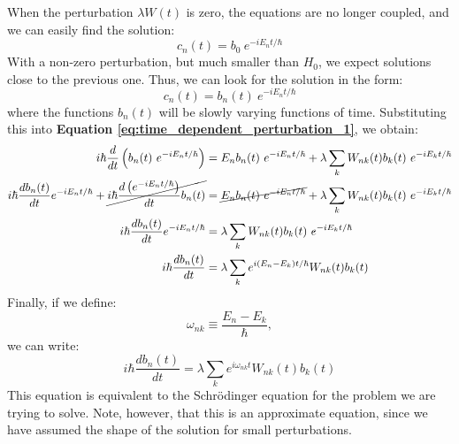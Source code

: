 When the perturbation $\lambda W(t)$ is zero, the equations are no longer coupled, and we can easily find the solution:
\begin{equation}
    c_n(t) = b_0\ e^{-iE_nt/\hbar}
\end{equation} 
With a non-zero perturbation, but much smaller than $H_0$, we expect solutions close to the previous one. Thus, we can look for the solution in the form:
\begin{equation}
    c_n(t) = b_n(t)\ e^{-iE_nt/\hbar}
\end{equation}
where the functions $b_n(t)$ will be slowly varying functions of time. Substituting this into \textbf{Equation \ref{eq:time_dependent_perturbation_1}}, we obtain:
\begin{equation}
    \begin{split}
        i\hbar \frac{d}{dt}\left(b_n(t)\ e^{-iE_nt/\hbar}\right) &= E_nb_n(t)\ e^{-iE_nt/\hbar} + \lambda\sum_{k} W_{nk}(t)b_k(t)\ e^{-iE_kt/\hbar}\\
        i\hbar \frac{db_n(t)}{dt} e^{-iE_nt/\hbar} + \cancel{i\hbar \frac{d\left(e^{-iE_nt/\hbar}\right)}{dt}b_n(t)}  &= \cancel{E_nb_n(t)\ e^{-iE_nt/\hbar}} + \lambda\sum_{k} W_{nk}(t)b_k(t)\ e^{-iE_kt/\hbar}\\
        i\hbar \frac{db_n(t)}{dt} e^{-iE_nt/\hbar} &= \lambda\sum_{k} W_{nk}(t)b_k(t)\ e^{-iE_kt/\hbar}\\
        i\hbar \frac{db_n(t)}{dt}  &= \lambda\sum_{k} e^{i(E_n-E_k)t/\hbar}W_{nk}(t)b_k(t)\\
    \end{split}
\end{equation}
Finally, if we define:
\begin{equation}
    \omega_{nk} \equiv \frac{E_n-E_k}{\hbar},
\end{equation}
we can write:
\begin{equation}\label{eq:time_dependent_perturbation_2}
    i \hbar\frac{db_n(t)}{dt}  = \lambda\sum_{k} e^{i\omega_{nk}t}W_{nk}(t)b_k(t)
\end{equation}
This equation is equivalent to the Schrödinger equation for the problem we are trying to solve. Note, however, that this is an approximate equation, since we have assumed the shape of the solution for small perturbations.

